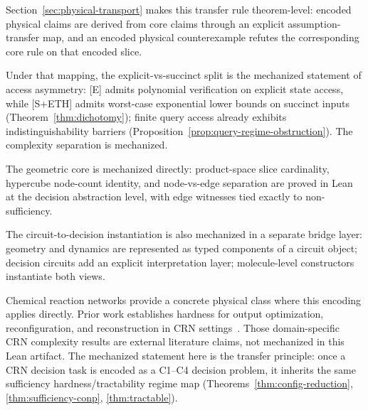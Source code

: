 Section~\ref{sec:physical-transport} makes this transfer rule theorem-level: encoded physical claims are derived from core claims through an explicit assumption-transfer map, and an encoded physical counterexample refutes the corresponding core rule on that encoded slice.

Under that mapping, the explicit-vs-succinct split is the mechanized statement of access asymmetry: [E] admits polynomial verification on explicit state access, while [S+ETH] admits worst-case exponential lower bounds on succinct inputs (Theorem~\ref{thm:dichotomy}); finite query access already exhibits indistinguishability barriers (Proposition~\ref{prop:query-regime-obstruction}). The complexity separation is mechanized.

The geometric core is mechanized directly: product-space slice cardinality, hypercube node-count identity, and node-vs-edge separation are proved in Lean at the decision abstraction level, with edge witnesses tied exactly to non-sufficiency.

The circuit-to-decision instantiation is also mechanized in a separate bridge layer: geometry and dynamics are represented as typed components of a circuit object; decision circuits add an explicit interpretation layer; molecule-level constructors instantiate both views.

Chemical reaction networks provide a concrete physical class where this encoding applies directly. Prior work establishes hardness for output optimization, reconfiguration, and reconstruction in CRN settings~\cite{andersen2012maximizing,alaniz2023complexity,flamml2013complexity}. Those domain-specific CRN complexity results are external literature claims, not mechanized in this Lean artifact. The mechanized statement here is the transfer principle: once a CRN decision task is encoded as a C1--C4 decision problem, it inherits the same sufficiency hardness/tractability regime map (Theorems~\ref{thm:config-reduction}, \ref{thm:sufficiency-conp}, \ref{thm:tractable}).

